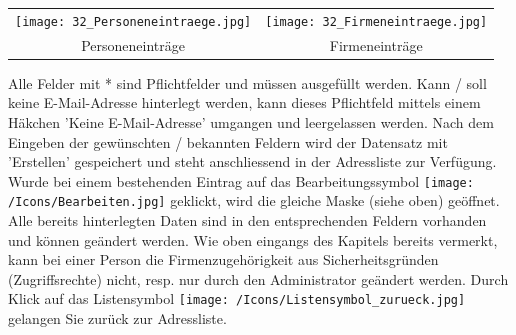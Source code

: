 \vspace{\baselineskip}

\begin{tabular}{cc} %
\texttt{[image: 32\_Personeneintraege.jpg]} & \texttt{[image: 32\_Firmeneintraege.jpg]} \\
Personeneinträge & Firmeneinträge \\
\end{tabular}


\vspace{\baselineskip}
Alle Felder mit * sind Pflichtfelder und müssen ausgefüllt werden. Kann / soll keine E-Mail-Adresse hinterlegt werden, kann dieses Pflichtfeld mittels einem Häkchen 'Keine E-Mail-Adresse'  umgangen und leergelassen werden. Nach dem Eingeben der gewünschten / bekannten Feldern wird der Datensatz mit 'Erstellen'  gespeichert und steht anschliessend in der Adressliste zur Verfügung. Wurde bei einem bestehenden Eintrag auf das Bearbeitungssymbol \texttt{[image: /Icons/Bearbeiten.jpg]} geklickt, wird die gleiche Maske (siehe oben) geöffnet. Alle bereits hinterlegten Daten sind in den entsprechenden Feldern vorhanden und können geändert werden. Wie oben eingangs des Kapitels bereits vermerkt, kann bei einer Person die Firmenzugehörigkeit aus Sicherheitsgründen (Zugriffsrechte) nicht, resp. nur durch den Administrator geändert werden.\newline
Durch Klick auf das Listensymbol \texttt{[image: /Icons/Listensymbol\_zurueck.jpg]}  gelangen Sie zurück zur Adressliste.
